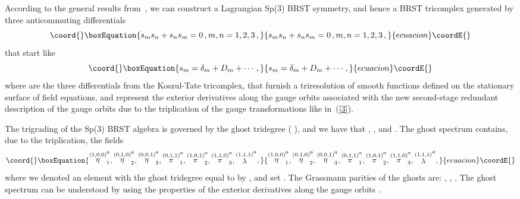\documentclass[a4paper,10pt]{article}
\begin{document}
According to the general results from~\cite{sp3gen}, we can construct a
Lagrangian Sp(3) BRST symmetry, and hence a BRST tricomplex generated by
three anticommuting differentials \coordHE{} 
\begin{equation}\coord{}\boxEquation{
\label{5}
s_{m}s_{n}+s_{n}s_{m}=0\,, m,n=1,2,3\,,
}{
s_{m}s_{n}+s_{n}s_{m}=0\,, m,n=1,2,3\,,
}{ecuacion}\coordE{}\end{equation}
that start like 
\begin{equation}\coord{}\boxEquation{
\label{6}
s_{m}=\delta _{m}+D_{m}+\cdots \,,
}{
s_{m}=\delta _{m}+D_{m}+\cdots \,,
}{ecuacion}\coordE{}\end{equation}
where \coordHE{} are the three differentials
from the Koszul-Tate tricomplex, that furnish a triresolution of smooth
functions defined on the stationary surface of field equations, and \coordHE{} represent the exterior derivatives along the gauge
orbits associated with the new second-stage redundant description of the
gauge orbits due to the triplication of the gauge transformations like 
in~(\ref{3}).

The trigrading of the Sp(3) BRST algebra is governed by the ghost tridegree (%
\coordHE{}), and we have that \coordHE{}, \coordHE{},
and \coordHE{}. The ghost
spectrum contains, due to the triplication, the fields 
\begin{equation}\coord{}\boxEquation{
\label{8}
\stackrel{(1,0,0)}{\eta }_{1}^{a},\stackrel{(0,1,0)}{\eta }_{2}^{a},
\stackrel{(0,0,1)}{\eta }_{3}^{a},\stackrel{(0,1,1)}{\pi }_{1}^{a},\stackrel{
(1,0,1)}{\pi }_{2}^{a},\stackrel{(1,1,0)}{\pi }_{3}^{a},\stackrel{(1,1,1)}{
\lambda }^{a},
}{
\stackrel{(1,0,0)}{\eta }_{1}^{a},\stackrel{(0,1,0)}{\eta }_{2}^{a},
\stackrel{(0,0,1)}{\eta }_{3}^{a},\stackrel{(0,1,1)}{\pi }_{1}^{a},\stackrel{
(1,0,1)}{\pi }_{2}^{a},\stackrel{(1,1,0)}{\pi }_{3}^{a},\stackrel{(1,1,1)}{
\lambda }^{a},
}{ecuacion}\coordE{}\end{equation}
where we denoted an element \coordHE{} with the ghost tridegree equal to \coordHE{} by \coordHE{}, and set \coordHE{}. The Grassmann parities of the
ghosts are: \coordHE{}, \coordHE{}, \coordHE{}. The ghost spectrum can be understood by using the properties of
the exterior derivatives along the gauge orbits~\cite{sp3gen}.
\end{document}
